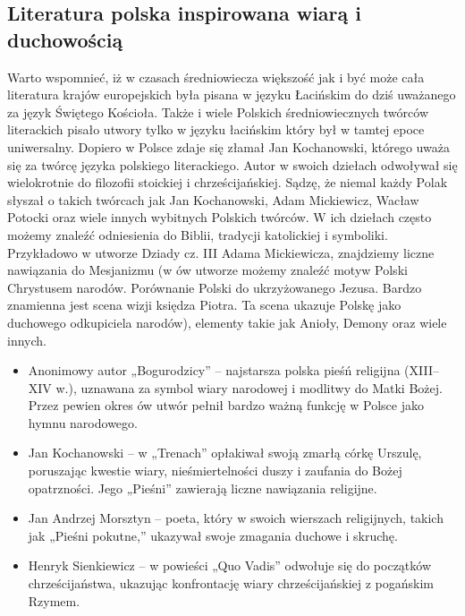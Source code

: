 \subsection{Literatura polska inspirowana wiarą i duchowością}

Warto wspomnieć, iż w czasach średniowiecza większość jak i być może cała literatura krajów europejskich była pisana w języku Łacińskim do dziś uważanego za język Świętego Kościoła. Także i wiele Polskich średniowiecznych twórców literackich pisało utwory tylko w języku łacińskim który był w tamtej epoce uniwersalny. Dopiero w Polsce zdaje się złamał Jan Kochanowski, którego uważa się za twórcę języka polskiego literackiego. Autor w swoich dziełach odwoływał się wielokrotnie do filozofii stoickiej i chrześcijańskiej. 
Sądzę, że niemal każdy Polak słyszał o takich twórcach jak Jan Kochanowski, Adam Mickiewicz, Wacław Potocki oraz wiele innych wybitnych Polskich twórców. W ich dziełach często możemy znaleźć odniesienia do Biblii, tradycji katolickiej i symboliki. Przykładowo w utworze Dziady cz. III Adama Mickiewicza, znajdziemy liczne nawiązania do Mesjanizmu (w ów utworze możemy znaleźć motyw Polski Chrystusem narodów. Porównanie Polski do ukrzyżowanego Jezusa. Bardzo znamienna jest scena wizji księdza Piotra. Ta scena ukazuje Polskę jako duchowego odkupiciela narodów), elementy takie jak Anioły, Demony oraz wiele innych.

\begin{itemize}
    \item Anonimowy autor „Bogurodzicy” – najstarsza polska pieśń religijna (XIII–XIV w.), uznawana za symbol wiary narodowej i modlitwy do Matki Bożej. Przez pewien okres ów utwór pełnił bardzo ważną funkcję w Polsce jako hymnu narodowego.
    \item Jan Kochanowski – w „Trenach” opłakiwał swoją zmarłą córkę Urszulę, poruszając kwestie wiary, nieśmiertelności duszy i zaufania do Bożej opatrzności. Jego „Pieśni” zawierają liczne nawiązania religijne.
    \item Jan Andrzej Morsztyn – poeta, który w swoich wierszach religijnych, takich jak „Pieśni pokutne,” ukazywał swoje zmagania duchowe i skruchę.
    \item Henryk Sienkiewicz – w powieści „Quo Vadis” odwołuje się do początków chrześcijaństwa, ukazując konfrontację wiary chrześcijańskiej z pogańskim Rzymem.


  \end{itemize}
  